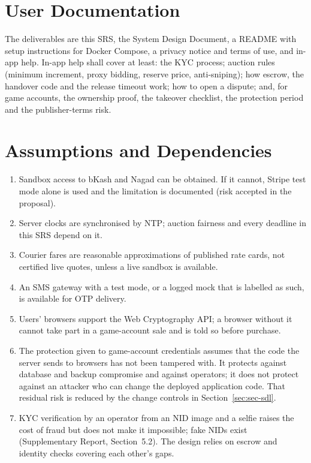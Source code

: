\documentclass[11pt,a4paper]{report}
\begin{document}
\section{User Documentation}
The deliverables are this SRS, the System Design Document, a README with setup instructions for Docker Compose, a privacy notice and terms of use, and in-app help. In-app help shall cover at least: the KYC process; auction rules (minimum increment, proxy bidding, reserve price, anti-sniping); how escrow, the handover code and the release timeout work; how to open a dispute; and, for game accounts, the ownership proof, the takeover checklist, the protection period and the publisher-terms risk.

\section{Assumptions and Dependencies}
\begin{enumerate}[label=\textbf{AS-\arabic*}, nosep, leftmargin=*]
    \item Sandbox access to bKash and Nagad can be obtained. If it cannot, Stripe test mode alone is used and the limitation is documented (risk accepted in the proposal).
    \item Server clocks are synchronised by NTP; auction fairness and every deadline in this SRS depend on it.
    \item Courier fares are reasonable approximations of published rate cards, not certified live quotes, unless a live sandbox is available.
    \item An SMS gateway with a test mode, or a logged mock that is labelled as such, is available for OTP delivery.
    \item Users' browsers support the Web Cryptography API; a browser without it cannot take part in a game-account sale and is told so before purchase.
    \item The protection given to game-account credentials assumes that the code the server sends to browsers has not been tampered with. It protects against database and backup compromise and against operators; it does not protect against an attacker who can change the deployed application code. That residual risk is reduced by the change controls in Section~\ref{sec:sec-sdl}.
    \item KYC verification by an operator from an NID image and a selfie raises the cost of fraud but does not make it impossible; fake NIDs exist (Supplementary Report, Section~5.2). The design relies on escrow and identity checks covering each other's gaps.
\end{enumerate}
\end{document}
